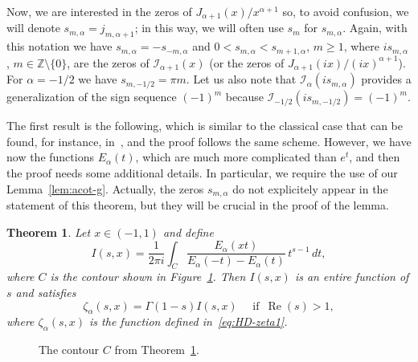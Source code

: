 \documentclass[a4paper]{amsart}
\newcommand{\Z}{\mathbb{Z}}
\newcommand{\I}{\mathcal{I}}
\newcommand{\Ea}{E_{\alpha}}
\renewcommand{\Re}{\operatorname{Re}}
\theoremstyle{plain}
\newtheorem{theorem}{Theorem}[section]
\theoremstyle{definition}
\theoremstyle{remark}
\numberwithin{equation}{section}
\begin{document}
Now, we are interested in the zeros of $J_{\alpha+1}(x)/x^{\alpha+1}$ so, to avoid confusion, we will denote $s_{m,\alpha} = j_{m,\alpha+1}$; in this way, we will often use $s_{m}$ for $s_{m,\alpha}$. Again, with this notation we have $s_{m,\alpha} = -s_{-m,\alpha}$ and $0< s_{m,\alpha} < s_{m+1,\alpha}$, $m\ge 1$, where $i s_{m,\alpha}$, $m \in \Z \setminus \{0\}$, are the zeros of $\I_{\alpha+1}(x)$ (or the zeros of $J_{\alpha+1}(ix)/(ix)^{\alpha+1}$). For $\alpha=-1/2$ we have $s_{m,-1/2}=\pi m$. Let us also note that $\I_{\alpha}(is_{m,\alpha})$ provides a generalization of the sign sequence $(-1)^m$ because $\I_{-1/2}(is_{m,-1/2})=(-1)^m$.

The first result is the following, which is similar to the classical case that can be found, for instance, in~\cite[\S\,12.4, Theorem~12.3]{Ap-ANT}, and the proof follows the same scheme. 
However, we have now the functions $E_\alpha(t)$, which are much more complicated than $e^t$, and then the proof needs some additional details. In particular, we require the use of our Lemma~\ref{lem:acot-g}. Actually, the zeros $s_{m,\alpha}$ do not explicitely appear in the statement of this theorem, but they will be crucial in the proof of the lemma. 

\begin{theorem}
\label{teo:Isz}
Let $x\in (-1,1)$ and define
\begin{equation}
\label{eq:Isz}
I(s,x) 
= \frac{1}{2\pi i}\int_C \frac{\Ea(xt)}{\Ea(-t)-\Ea(t)} \,t^{s-1}\,dt,
\end{equation}
where $C$ is the contour shown in Figure~\ref{fig:contour}. 
Then $I(s,x)$ is an entire function of $s$ and satisfies 
\begin{equation}
\label{eq:zetaaI}
\zeta_{\alpha}(s,x) = \Gamma(1-s)I(s,x)\quad \text{ if }\, \Re(s) > 1,
\end{equation}
where $\zeta_{\alpha}(s,x)$ is the function defined in~\eqref{eq:HD-zeta1}.
\end{theorem}

\begin{figure}[ht]
\caption{The contour $C$ from Theorem~\ref{teo:Isz}.}
\label{fig:contour}
\end{figure}
\end{document}
